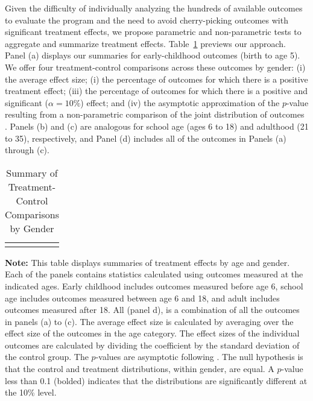 Given the difficulty of individually analyzing the hundreds of available outcomes to evaluate the program and the need to avoid cherry-picking outcomes with significant treatment effects, we propose parametric and non-parametric tests to aggregate and summarize treatment effects. Table~\ref{table:summary} previews our approach. Panel (a) displays our summaries for early-childhood outcomes (birth to age 5). We offer four treatment-control comparisons across these outcomes by gender: (i) the average effect size; (i) the percentage of outcomes for which there is a positive treatment effect; (iii) the percentage of outcomes for which there is a positive and significant ($\alpha=10\%$) effect; and (iv) the asymptotic approximation of the $p$-value resulting from a non-parametric comparison of the joint distribution of outcomes \citep{Rosenbaum_2005_Distribution_JRSS}. Panels (b) and (c) are analogous for school age (ages 6 to 18) and adulthood (21 to 35), respectively, and Panel (d) includes all of the outcomes in Panels (a) through (c).


\begin{table}[!htpb]
\begin{threeparttable}
\caption{Summary of Treatment-Control Comparisons by Gender} \label{table:summary}
\centering 
\begin{tabularx}{16.5cm}{XcX}
&  & 
\end{tabularx}
\begin{tablenotes}
\footnotesize
\item \textbf{Note:} This table displays summaries of treatment effects by age and gender. Each of the panels contains statistics calculated using outcomes measured at the indicated ages. Early childhood includes outcomes measured before age 6, school age includes outcomes measured between age 6 and 18, and adult includes outcomes measured after 18. All (panel d), is a combination of all the outcomes in panels (a) to (c). The average effect size is calculated by averaging over the effect size of the outcomes in the age category. The effect sizes of the individual outcomes are calculated by dividing the coefficient by the standard deviation of the control group. The $p$-values are asymptotic following \citet{Rosenbaum_2005_Distribution_JRSS}. The null hypothesis is that the control and treatment distributions, within gender, are equal. A $p$-value less than 0.1 (bolded) indicates that the distributions are significantly different at the 10\% level. 
\end{tablenotes}
\end{threeparttable}
\end{table}

